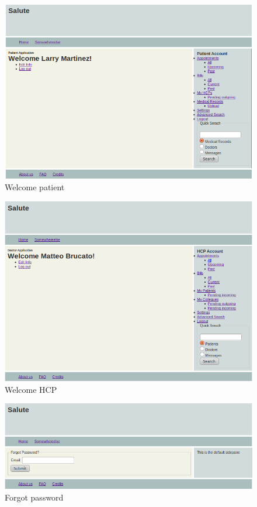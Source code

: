 \documentclass[10pt]{report}
\begin{document}
\begin{figure}
\includegraphics[scale=0.6]{screenshots/Welcome_patient.png}
\caption{Welcome patient}
\end{figure}
\clearpage
\begin{figure}
\includegraphics[scale=0.6]{screenshots/hcp_welcome.png}
\caption{Welcome HCP}
\end{figure}

\begin{figure}
\includegraphics[scale=0.6]{screenshots/forgot_pwd.png}
\caption{Forgot password}
\end{figure}
\end{document}
